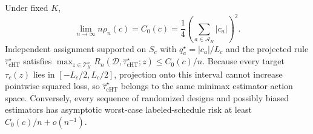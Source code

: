 Under fixed \(K\), \[\lim_{n\to\infty}n\rho_n(c)=C_0(c)=\frac{1}{4}\left(\sum_{a\in\mathcal A_K}|c_a|\right)^2.\] Independent assignment supported on \(S_c\) with \(q_a^\star=|c_a|/L_c\) and the projected rule \(\widehat\tau_{\mathrm{cHT}}^\star\) satisfies \(\max_{z\in\mathcal T_K^n}R_n(\mathcal D,\widehat\tau_{\mathrm{cHT}}^\star;z)\le C_0(c)/n\). Because every target \(\tau_c(z)\) lies in \([-L_c/2,L_c/2]\), projection onto this interval cannot increase pointwise squared loss, so \(\widehat\tau_{\mathrm{cHT}}^\star\) belongs to the same minimax estimator action space. Conversely, every sequence of randomized designs and possibly biased estimators has asymptotic worst-case labeled-schedule risk at least \(C_0(c)/n+o(n^{-1})\).
